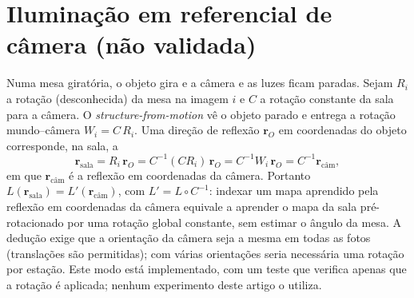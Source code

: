 \documentclass[12pt]{article}
\newcommand{\br}{\mathbf{r}}
\begin{document}
\section{Iluminação em referencial de câmera (não validada)}
\label{sec:mesa}
Numa mesa giratória, o objeto gira e a câmera e as luzes ficam paradas.
Sejam $R_i$ a rotação (desconhecida) da mesa na imagem $i$ e $C$ a rotação constante da sala para a câmera.
O \emph{structure-from-motion} vê o objeto parado e entrega a rotação mundo--câmera $W_i=C\,R_i$.
Uma direção de reflexão $\br_O$ em coordenadas do objeto corresponde, na sala, a
\begin{equation}
\br_{\text{sala}}=R_i\,\br_O=C^{-1}(C R_i)\,\br_O=C^{-1}W_i\,\br_O=C^{-1}\br_{\text{câm}},
\end{equation}
em que $\br_{\text{câm}}$ é a reflexão em coordenadas da câmera.
Portanto $L(\br_{\text{sala}})=L'(\br_{\text{câm}})$, com $L'=L\circ C^{-1}$: indexar um mapa aprendido pela reflexão em coordenadas da câmera equivale a aprender o mapa da sala pré-rotacionado por uma rotação global constante, sem estimar o ângulo da mesa.
A dedução exige que a orientação da câmera seja a mesma em todas as fotos (translações são permitidas); com várias orientações seria necessária uma rotação por estação.
Este modo está implementado, com um teste que verifica apenas que a rotação é aplicada; nenhum experimento deste artigo o utiliza.
\end{document}
